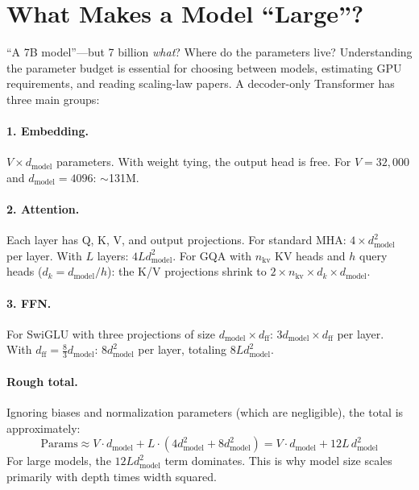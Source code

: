 \section{What Makes a Model ``Large''?}
\label{sec:model-scale}

``A 7B model''---but 7 billion \emph{what}? Where do the parameters live? Understanding the parameter budget is essential for choosing between models, estimating GPU requirements, and reading scaling-law papers. A decoder-only Transformer has three main groups:

\paragraph{1. Embedding.} $V \times d_{\text{model}}$ parameters. With weight tying, the output head is free. For $V = 32{,}000$ and $d_{\text{model}} = 4096$: $\sim$131M.

\paragraph{2. Attention.} Each layer has Q, K, V, and output projections. For standard MHA: $4 \times d_{\text{model}}^2$ per layer. With $L$ layers: $4L d_{\text{model}}^2$. For GQA with $n_{\text{kv}}$ KV heads and $h$ query heads ($d_k = d_{\text{model}} / h$): the K/V projections shrink to $2 \times n_{\text{kv}} \times d_k \times d_{\text{model}}$.

\paragraph{3. FFN.} For SwiGLU with three projections of size $d_{\text{model}} \times d_{\text{ff}}$: $3 d_{\text{model}} \times d_{\text{ff}}$ per layer. With $d_{\text{ff}} = \frac{8}{3} d_{\text{model}}$: $8 d_{\text{model}}^2$ per layer, totaling $8L d_{\text{model}}^2$.

\paragraph{Rough total.} Ignoring biases and normalization parameters (which are negligible), the total is approximately:
\[
  \text{Params} \approx V \cdot d_{\text{model}} + L \cdot (4 d_{\text{model}}^2 + 8 d_{\text{model}}^2) = V \cdot d_{\text{model}} + 12 L \, d_{\text{model}}^2
\]
For large models, the $12 L d_{\text{model}}^2$ term dominates. This is why model size scales primarily with depth times width squared.

